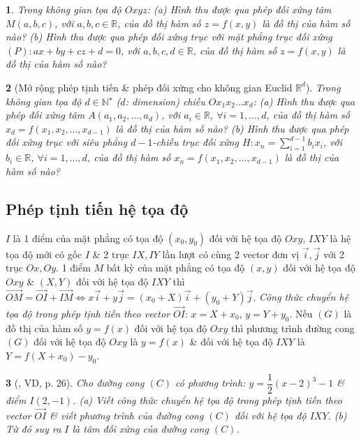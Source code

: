 \documentclass{article}
\newtheorem{baitoan}{}
\begin{document}
\begin{baitoan}
	Trong không gian tọa độ $Oxyz$: (a) Hình thu được qua phép đối xứng tâm $M(a,b,c)$, với $a,b,c\in\mathbb{R}$, của đồ thị hàm số $z = f(x,y)$ là đồ thị của hàm số nào? (b) Hình thu được qua phép đối xứng trục với mặt phẳng trục đối xứng $(P):ax + by + cz + d = 0$, với $a,b,c,d\in\mathbb{R}$, của đồ thị hàm số $z = f(x,y)$ là đồ thị của hàm số nào?
\end{baitoan}

\begin{baitoan}[Mở rộng phép tịnh tiến \& phép đối xứng cho không gian Euclid $\mathbb{R}^d$]
	Trong không gian tọa độ $d\in\mathbb{N}^\star$ ($d$: dimension) chiều $Ox_1x_2\ldots x_d$: (a) Hình thu được qua phép đối xứng tâm $A(a_1,a_2,\ldots,a_d)$, với $a_i\in\mathbb{R}$, $\forall i = 1,\ldots,d$, của đồ thị hàm số $x_d = f(x_1,x_2,\ldots,x_{d-1})$ là đồ thị của hàm số nào? (b) Hình thu được qua phép đối xứng trục với siêu phẳng $d - 1$-chiều trục đối xứng $H:x_n = \sum_{i=1}^{d-1} b_ix_i$, với $b_i\in\mathbb{R}$, $\forall i = 1,\ldots,d$, của đồ thị hàm số $x_n = f(x_1,x_2,\ldots,x_{d-1})$ là đồ thị của hàm số nào?
\end{baitoan}

\subsection{Phép tịnh tiến hệ tọa độ}
 $I$ là 1 điểm của mặt phẳng có tọa độ $(x_0,y_0)$ đối với hệ tọa độ $Oxy$, $IXY$ là hệ tọa độ mới có gốc $I$ \& 2 trục $IX,IY$ lần lượt có cùng 2 vector đơn vị $\vec{i},\vec{j}$ với 2 trục $Ox,Oy$. 1 điểm $M$ bất kỳ của mặt phẳng có tọa độ $(x,y)$ đối với hệ tọa độ $Oxy$ \& $(X,Y)$ đối với hệ tọa độ $IXY$ thì $\overrightarrow{OM} = \overrightarrow{OI} + \overrightarrow{IM}\Leftrightarrow x\vec{i} + y\vec{j} = (x_0 + X)\vec{i} + (y_0 + Y)\vec{j}$. {\it Công thức chuyển hệ tọa độ trong phép tịnh tiến theo vector $\overrightarrow{OI}$}: $x = X + x_0$, $y = Y + y_0$.  Nếu $(G)$ là đồ thị của hàm số $y = f(x)$ đối với hệ tọa độ $Oxy$  thì phương trình đường cong $(G)$ đối với hệ tọa độ $Oxy$ là $y = f(x)$ \& đối với hệ tọa độ $IXY$ là $Y = f(X + x_0) - y_0$.

\begin{baitoan}[\cite{SGK_Toan_12_giai_tich_nang_cao}, VD, p. 26]
	Cho đường cong $(C)$ có phương trình: $y = \dfrac{1}{2}(x - 2)^3 - 1$ \& điểm $I(2,-1)$. (a) Viết công thức chuyển hệ tọa độ trong phép tịnh tiến theo vector $\overrightarrow{OI}$ \& viết phương trình của đường cong $(C)$ đối với hệ tọa độ $IXY$. (b) Từ đó suy ra $I$ là tâm đối xứng của đường cong $(C)$.
\end{baitoan}
\end{document}
